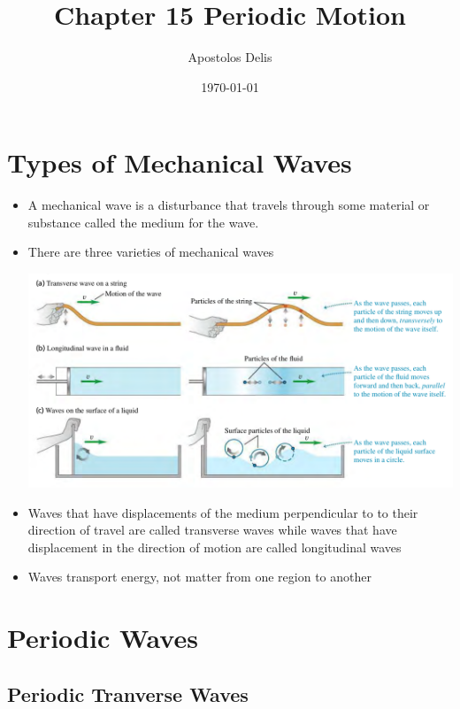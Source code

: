 \documentclass[11pt, a4paper]{article}
\begin{document}
\title{Chapter 15 Periodic Motion}
\author{Apostolos Delis}
\date{\today}
\maketitle

\tableofcontents
\section[15.1, Types of Mechanical Wabves]{Types of Mechanical Waves}
\begin{itemize}
    \item A mechanical wave is a disturbance that travels through some material or
        substance called the medium for the wave.
    \item There are three varieties of mechanical waves

\includegraphics[scale=0.55]{images/mech_waves.png}

    \item Waves that have displacements of the medium perpendicular to to their direction
        of travel are called transverse waves while waves that have displacement in
        the direction of motion are called longitudinal waves
    \item Waves transport energy, not matter from one region to another
\end{itemize}

\section[15.2, Periodic Waves]{Periodic Waves}

\subsection{Periodic Tranverse Waves}
\end{document}
